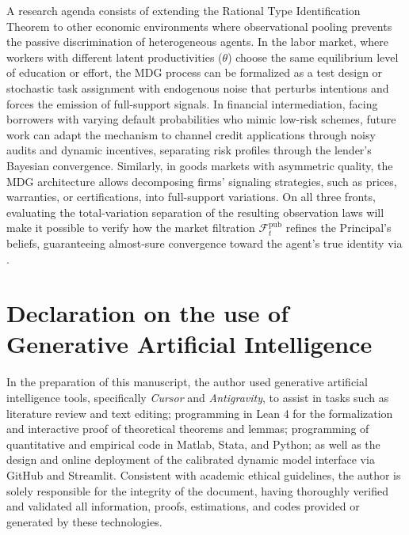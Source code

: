\documentclass[review,authoryear,12pt]{elsarticle}
\theoremstyle{plain}
\theoremstyle{definition}
\newcommand{\1}{\mathbf{1}}
\begin{document}
A research agenda consists of extending the Rational Type Identification Theorem to other economic environments where observational pooling prevents the passive discrimination of heterogeneous agents. In the labor market, where workers with different latent productivities ($\theta$) choose the same equilibrium level of education or effort, the MDG process can be formalized as a test design or stochastic task assignment with endogenous noise that perturbs intentions and forces the emission of full-support signals. In financial intermediation, facing borrowers with varying default probabilities who mimic low-risk schemes, future work can adapt the mechanism to channel credit applications through noisy audits and dynamic incentives, separating risk profiles through the lender's Bayesian convergence. Similarly, in goods markets with asymmetric quality, the MDG architecture allows decomposing firms' signaling strategies, such as prices, warranties, or certifications, into full-support variations. On all three fronts, evaluating the total-variation separation of the resulting observation laws will make it possible to verify how the market filtration $\mathcal{F}_t^{\mathrm{pub}}$ refines the Principal's beliefs, guaranteeing almost-sure convergence toward the agent's true identity via \citet{Kakutani1948}.




\section*{Declaration on the use of Generative Artificial Intelligence}

In the preparation of this manuscript, the author used generative artificial intelligence tools, specifically \emph{Cursor} and \emph{Antigravity}, to assist in tasks such as literature review and text editing; programming in Lean 4 for the formalization and interactive proof of theoretical theorems and lemmas; programming of quantitative and empirical code in Matlab, Stata, and Python; as well as the design and online deployment of the calibrated dynamic model interface via GitHub and Streamlit. Consistent with academic ethical guidelines, the author is solely responsible for the integrity of the document, having thoroughly verified and validated all information, proofs, estimations, and codes provided or generated by these technologies.




\end{document}

